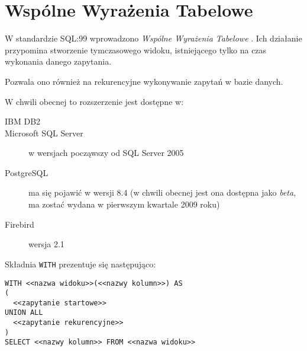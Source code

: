 \section{Wspólne Wyrażenia Tabelowe}





W standardzie SQL:99 wprowadzono \emph{Wspólne Wyrażenia Tabelowe} .
Ich działanie przypomina stworzenie tymczasowego widoku, 
istniejącego tylko na czas wykonania danego zapytania.


Pozwala ono również na rekurencyjne wykonywanie zapytań w bazie danych.

W chwili obecnej to rozszerzenie jest dostępne w:
\begin{description}
 \item[IBM DB2]
 \item[Microsoft SQL Server]
	w wersjach począwszy od SQL Server 2005
 \item[PostgreSQL]
	ma się pojawić w wersji 8.4 (w chwili obecnej jest ona dostępna jako \emph{beta}, ma zostać wydana w pierwszym kwartale 2009 roku)
 \item[Firebird]
	wersja 2.1 
\end{description}

Składnia \texttt{WITH} prezentuje się następująco:

\begin{verbatim}
WITH <<nazwa widoku>>(<<nazwy kolumn>>) AS
(
  <<zapytanie startowe>>
UNION ALL
  <<zapytanie rekurencyjne>>
)
SELECT <<nazwy kolumn>> FROM <<nazwa widoku>>
\end{verbatim}

